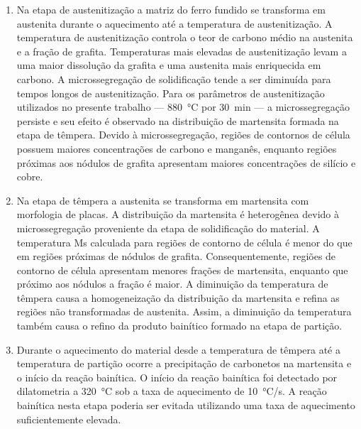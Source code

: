 \begin{enumerate}
  \item Na etapa de austenitização a matriz do ferro fundido se transforma em austenita durante o aquecimento até a temperatura de austenitização. A temperatura de austenitização controla o teor de carbono médio na austenita e a fração de grafita. Temperaturas mais elevadas de austenitização levam a uma maior dissolução da grafita e uma austenita mais enriquecida em carbono. A microssegregação de solidificação tende a ser diminuída para tempos longos de austenitização. Para os parâmetros de austenitização utilizados no presente trabalho --- \SI{880}{\degreeCelsius} por 30~min --- a microssegregação persiste e seu efeito é observado na distribuição de martensita formada na etapa de têmpera. Devido à microssegregação, regiões de contornos de célula possuem maiores concentrações de carbono e manganês, enquanto regiões próximas aos nódulos de grafita apresentam maiores concentrações de silício e cobre.

  \item Na etapa de têmpera a austenita se transforma em martensita com morfologia de placas. A distribuição da martensita é heterogênea devido à microssegregação proveniente da etapa de solidificação do material. A temperatura Ms calculada para regiões de contorno de célula é menor do que em regiões próximas de nódulos de grafita. Consequentemente, regiões de contorno de célula apresentam menores frações de martensita, enquanto que próximo aos nódulos a fração é maior. A diminuição da temperatura de têmpera causa a homogeneização da distribuição da martensita e refina as regiões não transformadas de austenita. Assim, a diminuição da temperatura também causa o refino da produto bainítico formado na etapa de partição.

  \item Durante o aquecimento do material desde a temperatura de têmpera até a temperatura de partição ocorre a precipitação de carbonetos na martensita e o início da reação bainítica. O início da reação bainítica foi detectado por dilatometria a \SI{320}{\degreeCelsius} sob a taxa de aquecimento de \SI{10}{\degreeCelsius/s}. A reação bainítica nesta etapa poderia ser evitada utilizando uma taxa de aquecimento suficientemente elevada.


\end{enumerate}
